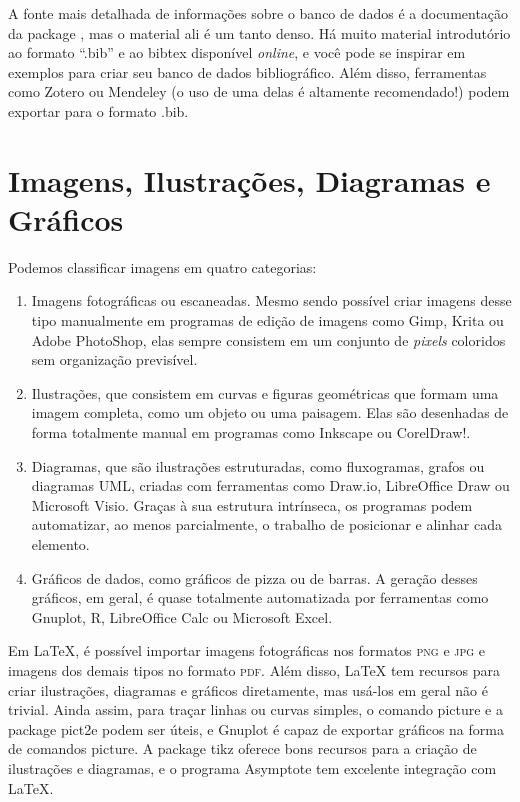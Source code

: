 A fonte mais detalhada de informações sobre o banco de dados é a
documentação da package , mas o material ali é um tanto denso.
Há muito material introdutório ao formato ``.bib'' e ao bibtex disponível
\emph{online}, e você pode se inspirar em exemplos para criar seu banco de
dados bibliográfico. Além disso, ferramentas como Zotero ou
Mendeley (o uso de uma delas é altamente recomendado!)
podem exportar para o formato .bib.

\section{Imagens, Ilustrações, Diagramas e Gráficos}

Podemos classificar imagens em quatro categorias:

\begin{enumerate}
    \item Imagens fotográficas ou escaneadas. Mesmo sendo possível criar
    imagens desse tipo manualmente em programas de edição de imagens como
    Gimp, Krita ou Adobe PhotoShop, elas sempre consistem em um conjunto
    de \emph{pixels} coloridos sem organização previsível.

    \item Ilustrações, que consistem em curvas e figuras geométricas
    que formam uma imagem completa, como um objeto ou uma paisagem.
    Elas são desenhadas de forma totalmente manual em programas como
    Inkscape ou CorelDraw!.

    \item Diagramas, que são ilustrações estruturadas, como fluxogramas,
    grafos ou diagramas UML, criadas com ferramentas como Draw.io,
    LibreOffice Draw ou Microsoft Visio. Graças à sua estrutura intrínseca,
    os programas podem automatizar, ao menos parcialmente, o trabalho de
    posicionar e alinhar cada elemento.

    \item Gráficos de dados, como gráficos de pizza ou de barras. A
    geração desses gráficos, em geral, é quase totalmente automatizada
    por ferramentas como Gnuplot, R, LibreOffice Calc ou Microsoft Excel.
\end{enumerate}

Em \LaTeX{}, é possível importar imagens fotográficas nos formatos
\textsc{png} e \textsc{jpg} e imagens dos demais tipos no formato
\textsc{pdf}. Além disso, \LaTeX{} tem recursos para criar ilustrações,
diagramas e gráficos diretamente, mas usá-los em geral não é trivial.
Ainda assim, para traçar linhas ou curvas simples, o comando
\textsf{picture} e a package \textsf{pict2e} podem ser úteis, e Gnuplot
é capaz de exportar gráficos na forma de comandos \textsf{picture}.
A package \textsf{tikz} oferece bons recursos para a criação de
ilustrações e diagramas, e o programa \textsf{Asymptote} tem excelente
integração com \LaTeX{}.

